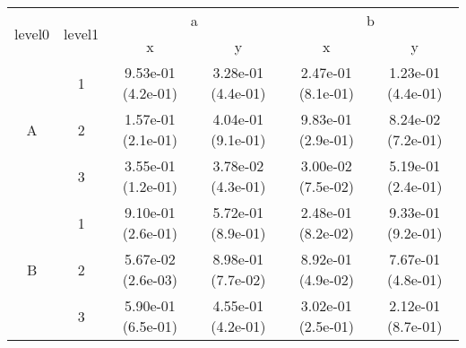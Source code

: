 \begin{tabular}{cccccc}
\toprule
\multirow{2}{*}{level0} & \multirow{2}{*}{level1}&\multicolumn{2}{c}{a}&\multicolumn{2}{c}{b}\tabularnewline
\cmidrule(lr){3-4}
\cmidrule(lr){5-6}
&&x&y&x&y\tabularnewline
\midrule
\multirow{3}{*}{A}&1& 9.53e-01 (4.2e-01)& 3.28e-01 (4.4e-01)& 2.47e-01 (8.1e-01)& 1.23e-01 (4.4e-01)\tabularnewline
&2& 1.57e-01 (2.1e-01)& 4.04e-01 (9.1e-01)& 9.83e-01 (2.9e-01)& 8.24e-02 (7.2e-01)\tabularnewline
&3& 3.55e-01 (1.2e-01)& 3.78e-02 (4.3e-01)& 3.00e-02 (7.5e-02)& 5.19e-01 (2.4e-01)\tabularnewline
\midrule
\multirow{3}{*}{B}&1& 9.10e-01 (2.6e-01)& 5.72e-01 (8.9e-01)& 2.48e-01 (8.2e-02)& 9.33e-01 (9.2e-01)\tabularnewline
&2& 5.67e-02 (2.6e-03)& 8.98e-01 (7.7e-02)& 8.92e-01 (4.9e-02)& 7.67e-01 (4.8e-01)\tabularnewline
&3& 5.90e-01 (6.5e-01)& 4.55e-01 (4.2e-01)& 3.02e-01 (2.5e-01)& 2.12e-01 (8.7e-01)\tabularnewline
\bottomrule
\end{tabular}

